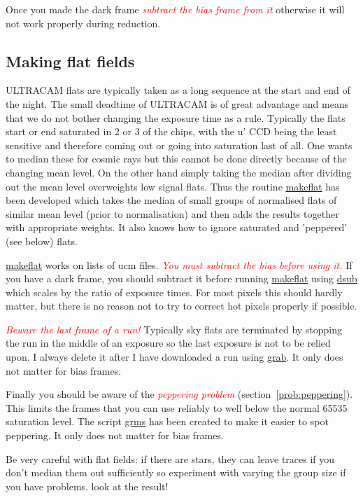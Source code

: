 \documentclass[10pt,a4paper,twocolumn]{article}
\newcommand{\main}{http://quetzel.csc.warwick.ac.uk/phsaap/software}
\newcommand{\ultracam}{\main/ultracam/html}
\newcommand{\warn}[1]{\textcolor{red}{\emph{#1}}}
\begin{document}
Once you made the dark frame \warn{subtract the bias frame from it} otherwise
it will not work properly during reduction.

\subsection{Making flat fields}

ULTRACAM flats are typically taken as a long sequence at the start and end of
the night. The small deadtime of ULTRACAM is of great advantage and means that
we do not bother changing the exposure time as a rule. Typically the flats start
or end saturated in 2 or 3 of the chips, with the u' CCD being the least
sensitive and therefore coming out or going into saturation last of all. One
wants to median these for cosmic rays but this cannot be done directly because
of the changing mean level. On the other hand simply taking the median after
dividing out the mean level overweights low signal flats. Thus the routine
\href{\ultracam/makeflat.html}{makeflat} has been developed which takes the
median of small groups of normalised flats of similar mean level (prior to
normalisation) and then adds the results together with appropriate weights.
It also knows how to ignore saturated and 'peppered' (see below) flats.

\href{\ultracam/makeflat.html}{makeflat} works on lists of ucm files. 
\warn{You must subtract the bias before using it.} If you have a dark frame,
you should subtract it before running \href{\ultracam/makeflat.html}{makeflat} 
using \href{\ultracam/dsub.html}{dsub} which scales by the ratio of 
exposure times. For most pixels this should hardly matter, but there is no
reason not to try to correct hot pixels properly if possible.

\warn{Beware the last frame of a run!} Typically sky flats are terminated by
stopping the run in the middle of an exposure so the last exposure is
not to be relied upon. I always delete it after I have downloaded a run using 
\href{\ultracam/grab.html}{grab}. It only does not matter for bias frames.

Finally you should be aware of the \warn{peppering problem}
(section~\ref{prob:peppering}). This limits the frames that you can
use reliably to well below the normal 65535 saturation level. The script
\href{\ultracam/grms.html}{grms} has been created to make it easier to spot
peppering. It only does not matter for bias frames.

Be very careful with flat fields: if there are stars, they can leave traces if
you don't median them out sufficiently so experiment with varying the group
size if you have problems.  look at the result!
\end{document}
